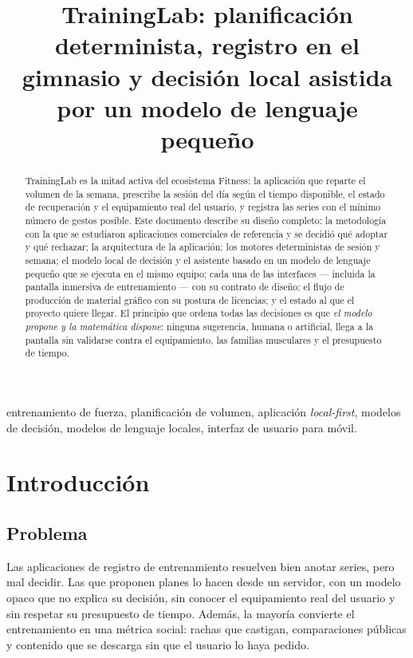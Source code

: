 \documentclass[conference]{IEEEtran}
\title{TrainingLab: planificaci\'on determinista, registro en el gimnasio y decisi\'on local asistida por un modelo de lenguaje peque\~no}
\author{
\IEEEauthorblockN{Alejandro Buend\'ia}
\IEEEauthorblockA{Proyecto Fitness --- BodyLab \& TrainingLab\\
Repositorio: \url{https://github.com/SCP-00/Fitness}\\
Proyecto personal de c\'odigo abierto}
}
\begin{document}
\maketitle

\begin{abstract}
TrainingLab es la mitad activa del ecosistema Fitness: la aplicaci\'on que
reparte el volumen de la semana, prescribe la sesi\'on del d\'ia seg\'un el
tiempo disponible, el estado de recuperaci\'on y el equipamiento real del
usuario, y registra las series con el m\'inimo n\'umero de gestos posible. Este
documento describe su dise\~no completo: la metodolog\'ia con la que se
estudiaron aplicaciones comerciales de referencia y se decidi\'o qu\'e adoptar
y qu\'e rechazar; la arquitectura de la aplicaci\'on; los motores
deterministas de sesi\'on y semana; el modelo local de decisi\'on y el asistente
basado en un modelo de lenguaje peque\~no que se ejecuta en el mismo equipo; cada
una de las interfaces --- incluida la pantalla inmersiva de entrenamiento --- con
su contrato de dise\~no; el flujo de producci\'on de material gr\'afico con su
postura de licencias; y el estado al que el proyecto quiere llegar.
El principio que ordena todas las decisiones es que \emph{el modelo propone y la
matem\'atica dispone}: ninguna sugerencia, humana o artificial, llega a la
pantalla sin validarse contra el equipamiento, las familias musculares y el
presupuesto de tiempo.
\end{abstract}

\begin{IEEEkeywords}
entrenamiento de fuerza, planificaci\'on de volumen, aplicaci\'on
\emph{local-first}, modelos de decisi\'on, modelos de lenguaje locales,
interfaz de usuario para m\'ovil.
\end{IEEEkeywords}

\section{Introducci\'on}

\subsection{Problema}
Las aplicaciones de registro de entrenamiento resuelven bien anotar series, pero
mal decidir. Las que proponen planes lo hacen desde un servidor, con un modelo
opaco que no explica su decisi\'on, sin conocer el equipamiento real del usuario
y sin respetar su presupuesto de tiempo. Adem\'as, la mayor\'ia convierte el
entrenamiento en una m\'etrica social: rachas que castigan, comparaciones
p\'ublicas y contenido que se descarga sin que el usuario lo haya pedido.
\end{document}
